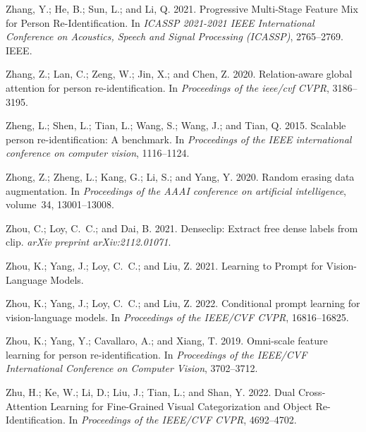 \documentclass[letterpaper]{article} \usepackage{aaai23}  \usepackage{times}  \usepackage{helvet}  \usepackage{courier}  \usepackage[hyphens]{url}  \usepackage{graphicx} \urlstyle{rm} \def\UrlFont{\rm}  \usepackage{natbib}  \usepackage{caption} \frenchspacing  \setlength{\pdfpagewidth}{8.5in}  \setlength{\pdfpageheight}{11in}  \usepackage{algorithm}
\begin{document}
\begin{small}
\begin{thebibliography}{65}
Zhang, Y.; He, B.; Sun, L.; and Li, Q. 2021{}.
\newblock Progressive Multi-Stage Feature Mix for Person Re-Identification.
\newblock In \emph{ICASSP 2021-2021 IEEE International Conference on Acoustics,
  Speech and Signal Processing (ICASSP)}, 2765--2769. IEEE.

Zhang, Z.; Lan, C.; Zeng, W.; Jin, X.; and Chen, Z. 2020.
\newblock Relation-aware global attention for person re-identification.
\newblock In \emph{Proceedings of the ieee/cvf CVPR}, 3186--3195.

Zheng, L.; Shen, L.; Tian, L.; Wang, S.; Wang, J.; and Tian, Q. 2015.
\newblock Scalable person re-identification: A benchmark.
\newblock In \emph{Proceedings of the IEEE international conference on computer
  vision}, 1116--1124.

Zhong, Z.; Zheng, L.; Kang, G.; Li, S.; and Yang, Y. 2020.
\newblock Random erasing data augmentation.
\newblock In \emph{Proceedings of the AAAI conference on artificial
  intelligence}, volume~34, 13001--13008.

Zhou, C.; Loy, C.~C.; and Dai, B. 2021.
\newblock Denseclip: Extract free dense labels from clip.
\newblock \emph{arXiv preprint arXiv:2112.01071}.

Zhou, K.; Yang, J.; Loy, C.~C.; and Liu, Z. 2021.
\newblock Learning to Prompt for Vision-Language Models.

Zhou, K.; Yang, J.; Loy, C.~C.; and Liu, Z. 2022.
\newblock Conditional prompt learning for vision-language models.
\newblock In \emph{Proceedings of the IEEE/CVF CVPR}, 16816--16825.

Zhou, K.; Yang, Y.; Cavallaro, A.; and Xiang, T. 2019.
\newblock Omni-scale feature learning for person re-identification.
\newblock In \emph{Proceedings of the IEEE/CVF International Conference on
  Computer Vision}, 3702--3712.

Zhu, H.; Ke, W.; Li, D.; Liu, J.; Tian, L.; and Shan, Y. 2022.
\newblock Dual Cross-Attention Learning for Fine-Grained Visual Categorization
  and Object Re-Identification.
\newblock In \emph{Proceedings of the IEEE/CVF CVPR}, 4692--4702.


\end{thebibliography}
\end{small}
\end{document}
